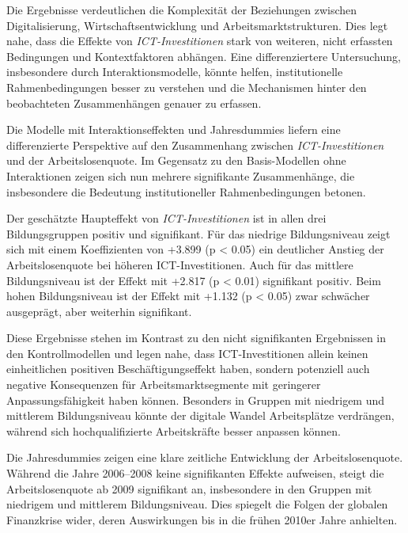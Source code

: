 Die Ergebnisse verdeutlichen die Komplexität der Beziehungen zwischen Digitalisierung, 
Wirtschaftsentwicklung und Arbeitsmarktstrukturen. Dies legt nahe, dass die Effekte von 
\textit{\ac{ICT}-Investitionen} stark von weiteren, nicht erfassten Bedingungen und 
Kontextfaktoren abhängen. Eine differenziertere Untersuchung, insbesondere durch 
Interaktionsmodelle, könnte helfen, institutionelle Rahmenbedingungen besser zu verstehen 
und die Mechanismen hinter den beobachteten Zusammenhängen genauer zu erfassen.



Die Modelle mit Interaktionseffekten und Jahresdummies liefern eine differenzierte Perspektive 
auf den Zusammenhang zwischen \textit{\ac{ICT}-Investitionen} und der Arbeitslosenquote. 
Im Gegensatz zu den Basis-Modellen ohne Interaktionen zeigen sich nun mehrere signifikante 
Zusammenhänge, die insbesondere die Bedeutung institutioneller Rahmenbedingungen betonen.

Der geschätzte Haupteffekt von \textit{\ac{ICT}-Investitionen} ist in allen drei 
Bildungsgruppen positiv und signifikant. Für das niedrige Bildungsniveau zeigt sich mit einem 
Koeffizienten von +3.899 (p < 0.05) ein deutlicher Anstieg der Arbeitslosenquote bei 
höheren ICT-Investitionen. Auch für das mittlere Bildungsniveau ist der Effekt mit 
+2.817 (p < 0.01) signifikant positiv. Beim hohen Bildungsniveau ist der Effekt mit 
+1.132 (p < 0.05) zwar schwächer ausgeprägt, aber weiterhin signifikant.

Diese Ergebnisse stehen im Kontrast zu den nicht signifikanten Ergebnissen in den 
Kontrollmodellen und legen nahe, dass ICT-Investitionen allein keinen einheitlichen positiven 
Beschäftigungseffekt haben, sondern potenziell auch negative Konsequenzen für 
Arbeitsmarktsegmente mit geringerer Anpassungsfähigkeit haben können. Besonders in Gruppen mit 
niedrigem und mittlerem Bildungsniveau könnte der digitale Wandel Arbeitsplätze verdrängen, 
während sich hochqualifizierte Arbeitskräfte besser anpassen können.

Die Jahresdummies zeigen eine klare zeitliche Entwicklung der Arbeitslosenquote. Während 
die Jahre 2006–2008 keine signifikanten Effekte aufweisen, steigt die Arbeitslosenquote ab 
2009 signifikant an, insbesondere in den Gruppen mit niedrigem und mittlerem 
Bildungsniveau. Dies spiegelt die Folgen der globalen Finanzkrise wider, deren Auswirkungen 
bis in die frühen 2010er Jahre anhielten.

